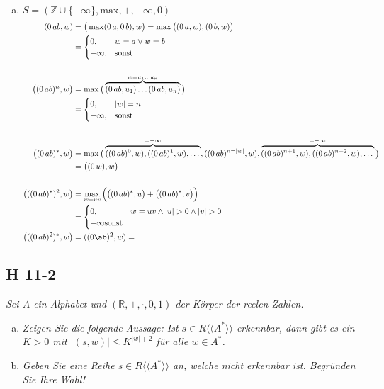 \documentclass{scrartcl}
\begin{document}
\begin{enumerate}[(a)]
    \item $S = (\mathbb{Z} \cup \{-\infty\}, \text{max}, +, -\infty, 0)$
    \begin{align*}
    (0\,ab, w) &=
      \big(\max(0\,a, 0\,b), w\big) = \max\big((0\,a, w), (0\,b, w)\big)\\
      &=\begin{cases}
        0, &w = a \lor w = b\\
        -\infty, &\text{sonst}
      \end{cases}\\
    \\
    \big((0\,ab)^n, w\big)
      &=\max\big(\overbrace{(0\,ab, u_1) \ldots (0\,ab, u_n)}^{w = u_1 \ldots u_n}\big)\\
      &=\begin{cases}
        0, &|w| = n\\
        -\infty, &\text{sonst}
      \end{cases}\\
    \\
    \big((0\,ab)^*, w\big)
      &= \max\big(\overbrace{((0\,ab)^0, w), ((0\,ab)^1, w), \ldots{}}^{=-\infty}, ((0\,ab)^{n=|w|}, w), \overbrace{((0\,ab)^{n+1}, w), ((0\,ab)^{n+2}, w), \ldots{}}^{=-\infty}\big)\\
      &= \big((0\,w), w\big)\\
    \\
    \big(((0\,ab)^*)^2, w\big)
      &= \max_{w=uv}\Big(\big((0\, ab)^*, u\big)+\big((0\, ab)^*, v\big)\Big)\\
      &= \begin{cases}
        0, &w=uv \land |u|>0 \land |v|>0\\
        -\infty\text{sonst}
      \end{cases}
    \\
    \big(((0\,ab)^2)^*, w\big)
      &= ((0\ab)^2, w) =
    \end{align*}
\end{enumerate}

\subsection{H 11-2}

\textsl{Sei $A$ ein Alphabet und $(\mathbb{R}, +, \cdot, 0, 1)$ der Körper der reelen Zahlen.}

\begin{enumerate}[(a)]
    \item \textsl{Zeigen Sie die folgende Aussage: Ist $s \in R\langle\langle A^* \rangle\rangle$ erkennbar, dann gibt es ein $K > 0$ mit $|(s, w)| \leq K^{|w|+2}$ für alle $w \in A^*$.}
    \item \textsl{Geben Sie eine Reihe $s \in R\langle\langle A^* \rangle\rangle$ an, welche nicht erkennbar ist. Begründen Sie Ihre Wahl!}
\end{enumerate}
\end{document}
